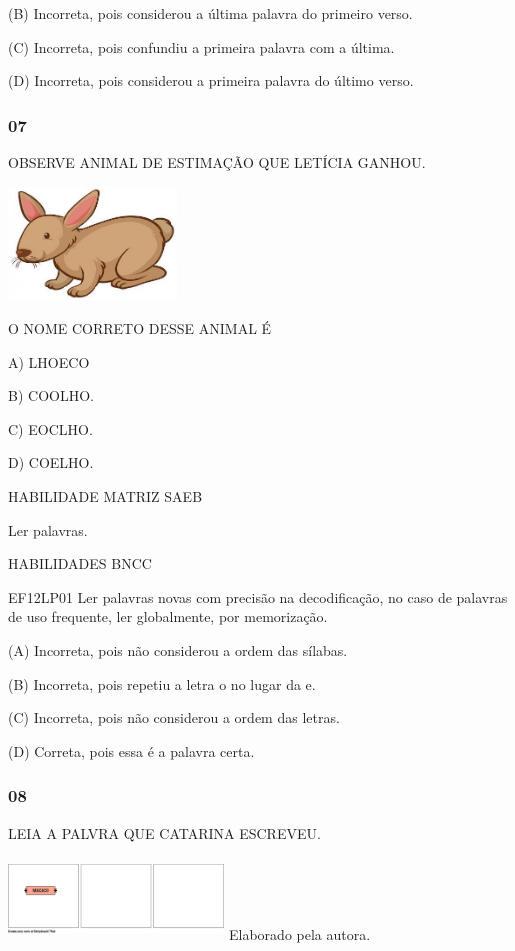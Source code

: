\begin{escola}
(B) Incorreta, pois considerou a última palavra do primeiro verso.

(C) Incorreta, pois confundiu a primeira palavra com a última.

(D) Incorreta, pois considerou a primeira palavra do último
verso.\protect\hypertarget{_heading=h.bww9mmn8u5sl}{}{}

\subsubsection{07}\label{section-79}

OBSERVE ANIMAL DE ESTIMAÇÃO QUE LETÍCIA GANHOU.

\includegraphics[width=1.75903in,height=1.18611in]{media/image246.jpg}

O NOME CORRETO DESSE ANIMAL É

A) LHOECO

B) COOLHO.

C) EOCLHO.

D) COELHO.

HABILIDADE MATRIZ SAEB

Ler palavras.

HABILIDADES BNCC

EF12LP01 Ler palavras novas com precisão na decodificação, no caso de
palavras de uso frequente, ler globalmente, por memorização.

(A) Incorreta, pois não considerou a ordem das sílabas.

(B) Incorreta, pois repetiu a letra o no lugar da e.

(C) Incorreta, pois não considerou a ordem das letras.

(D) Correta, pois essa é a palavra
certa.\protect\hypertarget{_heading=h.9bc4fu3nu5it}{}{}

\subsubsection{08}\label{section-80}

LEIA A PALVRA QUE CATARINA ESCREVEU.

\includegraphics[width=2.25361in,height=0.86599in]{media/image247.png}
Elaborado pela autora.


\end{escola}
